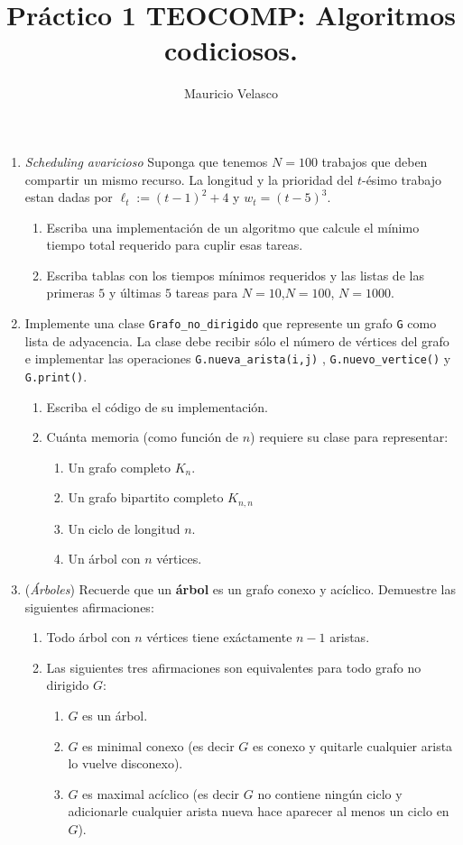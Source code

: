 \documentclass[12pt, a4paper]{article}
\date{}
\begin{document}
\title{Pr\'actico 1 TEOCOMP: Algoritmos codiciosos.}
\author{Mauricio Velasco}
\maketitle{}
\begin{enumerate} 

\item {\it Scheduling avaricioso} Suponga que tenemos $N=100$ trabajos que deben compartir un mismo recurso. La longitud y la prioridad del $t$-ésimo trabajo estan dadas por $\ell_t:=(t-1)^2+4$ y $w_t=(t-5)^3$.
\begin{enumerate}
\item Escriba una implementación de un algoritmo que calcule el mínimo tiempo total requerido para cuplir esas tareas.
\item Escriba tablas con los tiempos mínimos requeridos y las listas de las primeras $5$ y últimas $5$ tareas para $N=10$,$N=100$, $N=1000$.
\end{enumerate} 


\item Implemente una clase \verb!Grafo_no_dirigido! que represente un grafo \verb!G! como lista de adyacencia. La clase debe recibir sólo el número de vértices del grafo e implementar las operaciones \verb!G.nueva_arista(i,j)! , \verb!G.nuevo_vertice()! y \verb!G.print()!.
\begin{enumerate}
\item Escriba el c\'odigo de su implementaci\'on.
\item Cu\'anta memoria (como funci\'on de $n$) requiere su clase para representar:
\begin{enumerate}
\item Un grafo completo $K_n$.
\item Un grafo bipartito completo $K_{n,n}$
\item Un ciclo de longitud $n$.
\item Un \'arbol con $n$ v\'ertices.
\end{enumerate} 
\end{enumerate}

\item({\it Árboles}) Recuerde que un {\bf árbol} es un grafo conexo y acíclico. Demuestre las siguientes afirmaciones:

\begin{enumerate}
\item Todo árbol con $n$ vértices tiene exáctamente $n-1$ aristas.
\item Las siguientes tres afirmaciones son equivalentes para todo grafo no dirigido $G$:
\begin{enumerate}
\item $G$ es un árbol.
\item $G$ es minimal conexo (es decir $G$ es conexo y quitarle cualquier arista lo vuelve disconexo).
\item $G$ es maximal acíclico (es decir $G$ no contiene ningún ciclo y adicionarle cualquier arista nueva hace aparecer al menos un ciclo en $G$).
\end{enumerate}
\end{enumerate} 



\end{enumerate}
\end{document}
